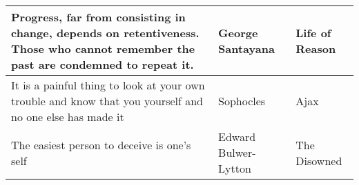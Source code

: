 \documentclass{article}
\begin{document}
\begin{tabularx}{0.8\textwidth} { 
  | >{\centering\arraybackslash}X 
  | >{\centering\arraybackslash}X 
  |  >{\centering\arraybackslash}X |}
    Progress, far from consisting in change, depends on retentiveness. Those who cannot remember the past are condemned to repeat it.
    & George Santayana
    & Life of Reason\\

    \hline

    It is a painful thing to look at your own trouble and know that you yourself and no one else has made it 
    & Sophocles 
    & Ajax \\

    \hline

    The easiest person to deceive is one's self 
    & Edward Bulwer-Lytton 
    & The Disowned \\

    \hline
  \end{tabularx}
\end{document}
